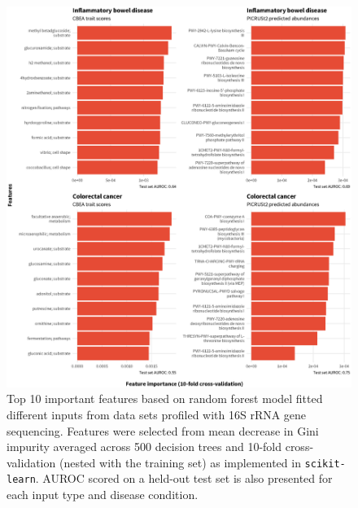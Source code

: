 \begin{figure} [!ht]
    \centering
    \includegraphics[width=\linewidth]{figures/appD_fs2.eps}
    \caption[Top 10 important features based on random forest model fitted different inputs from data sets profiled with 16S rRNA gene sequencing]{Top 10 important features based on random forest model fitted different inputs from data sets profiled with 16S rRNA gene sequencing. Features were selected from mean decrease in Gini impurity averaged across 500 decision trees and 10-fold cross-validation (nested with the training set) as implemented in \texttt{scikit-learn}. AUROC scored on a held-out test set is also presented for each input type and disease condition.}
    \label{fig:d2}
\end{figure}